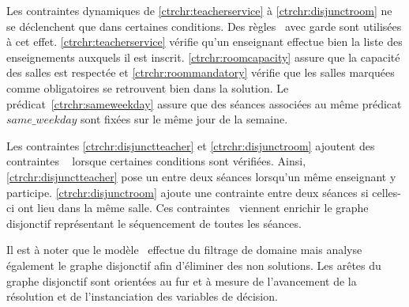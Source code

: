Les contraintes dynamiques de \ref{ctrchr:teacherservice} à \ref{ctrchr:disjunctroom} ne se déclenchent que dans certaines conditions. Des règles \CHR\ avec garde sont utilisées à cet effet. \ref{ctrchr:teacherservice} vérifie qu'un enseignant effectue bien la liste des enseignements auxquels il est inscrit. \ref{ctrchr:roomcapacity} assure que la capacité des salles est respectée et \ref{ctrchr:roommandatory} vérifie que les salles marquées comme obligatoires se retrouvent bien dans la solution. Le prédicat~\ref{ctrchr:sameweekday} assure que des séances associées au même prédicat $same\_weekday$ sont fixées sur le même jour de la semaine.

Les contraintes \ref{ctrchr:disjunctteacher} et \ref{ctrchr:disjunctroom} ajoutent des contraintes \CHR\  lorsque certaines conditions sont vérifiées. Ainsi, \ref{ctrchr:disjunctteacher} pose un  entre deux séances lorsqu'un même enseignant y participe. \ref{ctrchr:disjunctroom} ajoute une contrainte  entre deux séances si celles-ci ont lieu dans la même salle. Ces contraintes \CHR\ viennent enrichir le graphe disjonctif représentant le séquencement de toutes les séances.


%
%

Il est à noter que le modèle \CHR\ effectue du filtrage de domaine mais analyse également le graphe disjonctif afin d'éliminer des non solutions. Les arêtes du graphe disjonctif sont orientées au fur et à mesure de l'avancement de la résolution et de l'instanciation des variables de décision. 
